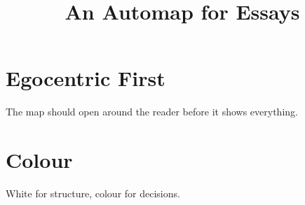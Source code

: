 \documentclass{article}
\title{An Automap for Essays}
\begin{document}
\section{Egocentric First}\label{sec:map-ego}
The map should open around the reader before it shows everything.
\section{Colour}\label{sec:map-colour}
White for structure, colour for decisions.
\end{document}
